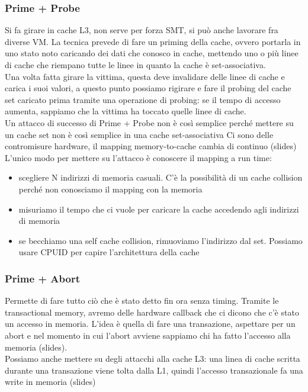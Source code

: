 \documentclass[12pt, oneside]{extbook} %
\begin{document}
\subsubsection{Prime + Probe}
Si fa girare in cache L3, non serve per forza SMT, si può anche lavorare fra diverse VM. La tecnica prevede di fare un priming della cache, ovvero portarla in uno stato noto caricando dei dati che conosco in cache, mettendo uno o più linee di cache che riempano tutte le linee in quanto la cache è set-associativa.\\ Una volta fatta girare la vittima, questa deve invalidare delle linee di cache e carica i suoi valori, a questo punto possiamo rigirare e fare il probing del cache set caricato prima tramite una operazione di probing: se il tempo di accesso aumenta, sappiamo che la vittima ha toccato quelle linee di cache.\\ Un attacco di successo di Prime + Probe non è così semplice perché mettere su un cache set non è così semplice in una cache set-associativa
Ci sono delle contromisure hardware, il mapping memory-to-cache cambia di continuo (slides)\\ L'unico modo per mettere su l'attacco è conoscere il mapping a run time:
\begin{itemize}
\item scegliere N indirizzi di memoria casuali. C'è la possibilità di un cache collision perché non conosciamo il mapping con la memoria
\item misuriamo il tempo che ci vuole per caricare la cache accedendo agli indirizzi di memoria
\item se becchiamo una self cache collision, rimuoviamo l'indirizzo dal set. Possiamo usare CPUID per capire l'architettura della cache
\end{itemize}
\subsubsection{Prime + Abort}
Permette di fare tutto ciò che è stato detto fin ora senza timing. Tramite le transactional memory, avremo delle hardware callback che ci dicono che c'è stato un accesso in memoria. L'idea è quella di fare una transazione, aspettare per un abort e nel momento in cui l'abort avviene sappiamo chi ha fatto l'accesso alla memoria (slides).\\ Possiamo anche mettere su degli attacchi alla cache L3: una linea di cache scritta durante una transazione viene tolta dalla L1, quindi l'accesso transazionale fa una write in memoria (slides)
\end{document}
